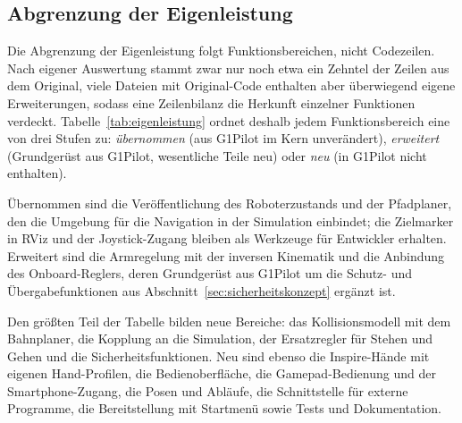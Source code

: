\subsection{Abgrenzung der Eigenleistung}
\label{sec:eigenleistung}
Die Abgrenzung der Eigenleistung folgt Funktionsbereichen, nicht Codezeilen.
Nach eigener Auswertung stammt zwar nur noch etwa ein Zehntel der Zeilen aus dem Original, viele Dateien mit Original-Code enthalten aber überwiegend eigene Erweiterungen, sodass eine Zeilenbilanz die Herkunft einzelner Funktionen verdeckt.
Tabelle~\ref{tab:eigenleistung} ordnet deshalb jedem Funktionsbereich eine von drei Stufen zu: \emph{übernommen} (aus G1Pilot im Kern unverändert), \emph{erweitert} (Grundgerüst aus G1Pilot, wesentliche Teile neu) oder \emph{neu} (in G1Pilot nicht enthalten).

Übernommen sind die Veröffentlichung des Roboterzustands und der Pfadplaner, den die Umgebung für die Navigation in der Simulation einbindet; die Zielmarker in RViz und der Joystick-Zugang bleiben als Werkzeuge für Entwickler erhalten.
Erweitert sind die Armregelung mit der inversen Kinematik und die Anbindung des Onboard-Reglers, deren Grundgerüst aus G1Pilot um die Schutz- und Übergabefunktionen aus Abschnitt~\ref{sec:sicherheitskonzept} ergänzt ist.

Den größten Teil der Tabelle bilden neue Bereiche: das Kollisionsmodell mit dem Bahnplaner, die Kopplung an die Simulation, der Ersatzregler für Stehen und Gehen und die Sicherheitsfunktionen.
Neu sind ebenso die Inspire-Hände mit eigenen Hand-Profilen, die Bedienoberfläche, die Gamepad-Bedienung und der Smartphone-Zugang, die Posen und Abläufe, die Schnittstelle für externe Programme, die Bereitstellung mit Startmenü sowie Tests und Dokumentation.

